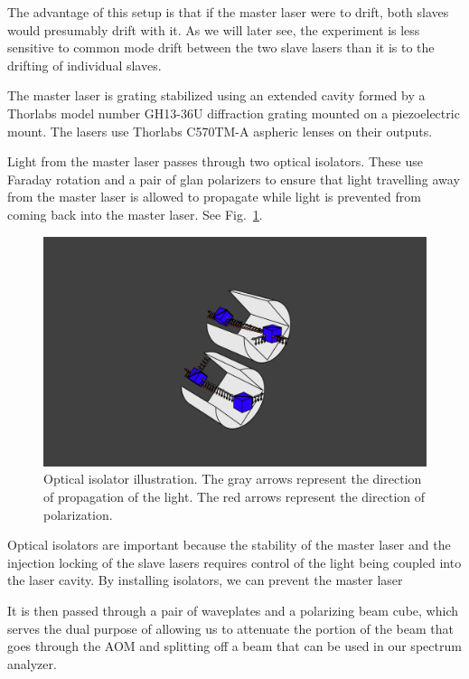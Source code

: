 The advantage of this setup is that if the master laser were to drift, both slaves would presumably drift with it. As we will later see, the experiment is less sensitive to common mode drift between the two slave lasers than it is to the drifting of individual slaves.

The master laser is grating stabilized using an extended cavity formed by a Thorlabs model number GH13-36U  %
diffraction grating mounted on a piezoelectric mount. The lasers use Thorlabs C570TM-A aspheric lenses on their outputs. 

Light from the master laser passes through two optical isolators. These use Faraday rotation and a pair of glan polarizers to ensure that light travelling away from the master laser is allowed to propagate while light is prevented from coming back into the master laser. See Fig.~\ref{isolatorPicture}.

\begin{figure}
\label{isolatorPicture}
\centerline{\includegraphics[width=1\textwidth]{isolators}}
\caption[Optical Isolator Illustration]{Optical isolator illustration. The gray arrows represent the direction of propagation of the light. The red arrows represent the direction of polarization.}
\end{figure}

Optical isolators are important because the stability of the master laser and the injection locking of the slave lasers requires control of the light being coupled into the laser cavity. By installing isolators, we can prevent the master laser


It is then passed through a pair of waveplates and a polarizing beam cube, which serves the dual purpose of allowing us to attenuate the portion of the beam that goes through the AOM and splitting off a beam that can be used in our spectrum analyzer. 

